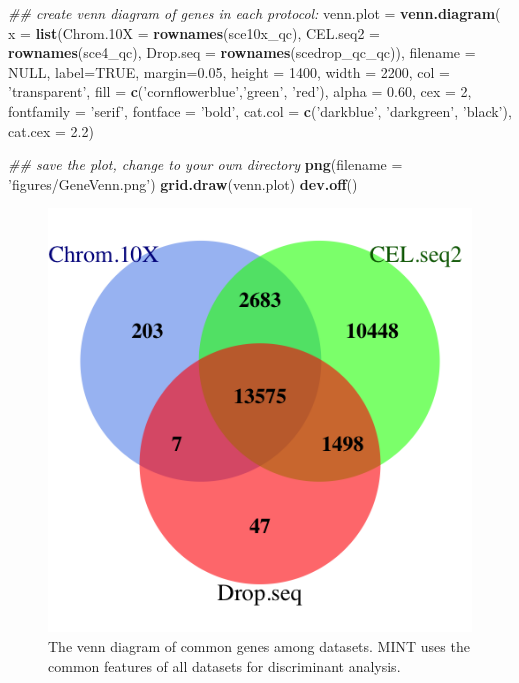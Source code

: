 \documentclass[]{book}
\newenvironment{Shaded}{\begin{snugshade}}{\end{snugshade}}
\newcommand{\CommentTok}[1]{\textcolor[rgb]{0.56,0.35,0.01}{\textit{#1}}}
\newcommand{\DataTypeTok}[1]{\textcolor[rgb]{0.13,0.29,0.53}{#1}}
\newcommand{\DecValTok}[1]{\textcolor[rgb]{0.00,0.00,0.81}{#1}}
\newcommand{\FloatTok}[1]{\textcolor[rgb]{0.00,0.00,0.81}{#1}}
\newcommand{\KeywordTok}[1]{\textcolor[rgb]{0.13,0.29,0.53}{\textbf{#1}}}
\newcommand{\NormalTok}[1]{#1}
\newcommand{\OtherTok}[1]{\textcolor[rgb]{0.56,0.35,0.01}{#1}}
\newcommand{\StringTok}[1]{\textcolor[rgb]{0.31,0.60,0.02}{#1}}
\theoremstyle{definition}
\theoremstyle{definition}
\theoremstyle{definition}
\theoremstyle{remark}
\begin{document}
\begin{Shaded}
\begin{Highlighting}[]
\CommentTok{## create venn diagram of genes in each protocol:}
\NormalTok{venn.plot =}\StringTok{ }\KeywordTok{venn.diagram}\NormalTok{(}
  \DataTypeTok{x =} \KeywordTok{list}\NormalTok{(}\DataTypeTok{Chrom.10X =} \KeywordTok{rownames}\NormalTok{(sce10x_qc),}
           \DataTypeTok{CEL.seq2 =} \KeywordTok{rownames}\NormalTok{(sce4_qc),}
           \DataTypeTok{Drop.seq =} \KeywordTok{rownames}\NormalTok{(scedrop_qc_qc)),}
  \DataTypeTok{filename =} \OtherTok{NULL}\NormalTok{, }\DataTypeTok{label=}\OtherTok{TRUE}\NormalTok{, }\DataTypeTok{margin=}\FloatTok{0.05}\NormalTok{,}
  \DataTypeTok{height =} \DecValTok{1400}\NormalTok{, }\DataTypeTok{width =} \DecValTok{2200}\NormalTok{,}
  \DataTypeTok{col =} \StringTok{'transparent'}\NormalTok{, }\DataTypeTok{fill =} \KeywordTok{c}\NormalTok{(}\StringTok{'cornflowerblue'}\NormalTok{,}\StringTok{'green'}\NormalTok{, }\StringTok{'red'}\NormalTok{),}
  \DataTypeTok{alpha =} \FloatTok{0.60}\NormalTok{, }\DataTypeTok{cex =} \DecValTok{2}\NormalTok{, }\DataTypeTok{fontfamily =} \StringTok{'serif'}\NormalTok{, }\DataTypeTok{fontface =} \StringTok{'bold'}\NormalTok{,}
  \DataTypeTok{cat.col =} \KeywordTok{c}\NormalTok{(}\StringTok{'darkblue'}\NormalTok{, }\StringTok{'darkgreen'}\NormalTok{, }\StringTok{'black'}\NormalTok{), }\DataTypeTok{cat.cex =} \FloatTok{2.2}\NormalTok{)}

\CommentTok{## save the plot, change to your own directory}
\KeywordTok{png}\NormalTok{(}\DataTypeTok{filename =} \StringTok{'figures/GeneVenn.png'}\NormalTok{)}
\KeywordTok{grid.draw}\NormalTok{(venn.plot)}
\KeywordTok{dev.off}\NormalTok{()}
\end{Highlighting}
\end{Shaded}

\begin{figure}[ht]

{\centering \includegraphics[width=0.4\linewidth]{figures/GeneVenn} 

}

\caption{ The venn diagram of common genes among datasets. MINT uses the common features of all datasets for discriminant analysis.}\label{fig:1-vennDiag}
\end{figure}
\end{document}
